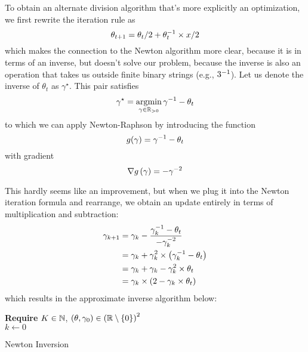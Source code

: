 \documentclass[../../thesis.tex]{subfiles}
\begin{document}
To obtain an alternate division algorithm
that's more explicitly an optimization,
we first rewrite the iteration rule as
\begin{equation}\equationlabel{babylon-inv-iter}
	\theta_{t+1} = \theta_t / 2 + \inv{\theta_t} \times x / 2
\end{equation}
\noindent which makes the connection
to the Newton algorithm more clear,
because it is in terms of an inverse,
but doesn't solve our problem,
because the inverse is also an operation
that takes us outside finite binary strings
(e.g., $3^{-1}$).
Let us denote the inverse of $\theta_t$
as $\gamma^\star$.
This pair satisfies
\begin{equation}
	\gamma^\star = \mathop{\mathrm{argmin}}_{\gamma \in \mathbb{R}_{>0}} \gamma^{-1} - \theta_t
\end{equation}
\noindent
to which we can apply Newton-Raphson
by introducing the function
\begin{equation}
	g(\gamma) = \gamma^{-1} - \theta_t
\end{equation}
\noindent with gradient
\begin{equation}
	\nabla g\left(\gamma\right) = -\gamma^{-2}
\end{equation}

This hardly seems like an improvement,
but when we plug it into the Newton iteration formula
and rearrange,
we obtain an update entirely in terms of
multiplication and subtraction:
\begin{align}
	\gamma_{k+1}
	&= \gamma_k - \frac{\gamma_k^{-1} - \theta_t}{-\gamma_k^{-2}}\\
	&= \gamma_k + \gamma_k^2 \times \left(\gamma_k^{-1} - \theta_t\right)\\
	&= \gamma_k + \gamma_k - \gamma_k^2\times \theta_t\\
	&= \gamma_k \times \left(2 - \gamma_k \times \theta_t\right)
\end{align}
\noindent which results in the approximate inverse algorithm below:
\\
\begin{algorithm}[H]
    \SetAlgoLined{}
    \textbf{Require}
    $K\in \mathbb{N}$, $(\theta, \gamma_0) \in {\left(\mathbb{R}\setminus \left\{0\right\} \right)}^2 $\ \\
    $k \leftarrow 0$\\
    \caption{Newton Inversion}
\end{algorithm}
\end{document}
